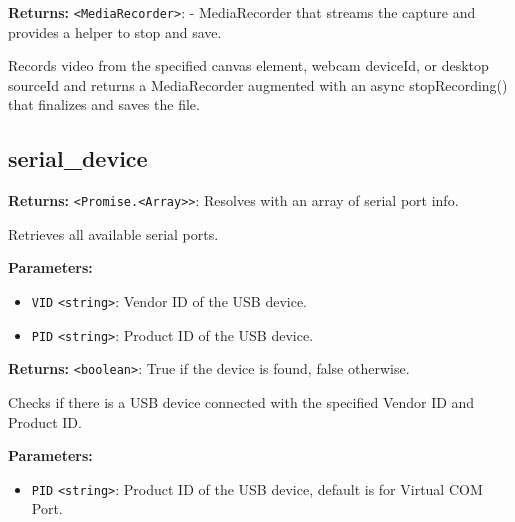 \documentclass[12pt,a4paper]{article}
\begin{document}
\noindent \textbf{Returns:} \texttt{<MediaRecorder>}: - MediaRecorder that streams the capture and provides a helper to stop and save.

\noindent Records video from the specified canvas element, webcam deviceId, or desktop sourceId and returns a MediaRecorder augmented with an async stopRecording() that finalizes and saves the file.


\subsection{serial\_device}
\vspace{5mm}
\noindent {}


\noindent \textbf{Returns:} \texttt{<Promise.<Array>>}: Resolves with an array of serial port info.

\noindent Retrieves all available serial ports.

\vspace{5mm}
\noindent {}


\noindent \textbf{Parameters:}
\begin{itemize}
  \item \texttt{VID} \texttt{<string>}: Vendor ID of the USB device.
  \item \texttt{PID} \texttt{<string>}: Product ID of the USB device.
\end{itemize}

\noindent \textbf{Returns:} \texttt{<boolean>}: True if the device is found, false otherwise.

\noindent Checks if there is a USB device connected with the specified Vendor ID and Product ID.

\vspace{5mm}
\noindent {}


\noindent \textbf{Parameters:}
\begin{itemize}
  \item \texttt{PID} \texttt{<string>}: Product ID of the USB device, default is for Virtual COM Port.
\end{itemize}
\end{document}
